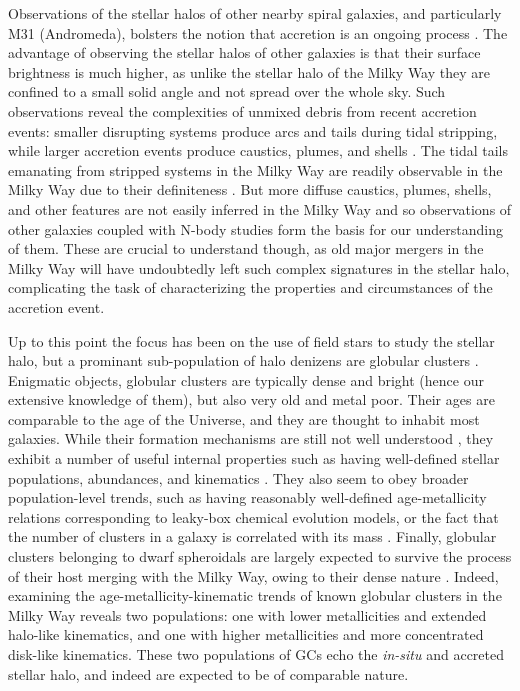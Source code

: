 Observations of the stellar halos of other nearby spiral galaxies, and particularly M31 (Andromeda), bolsters the notion that accretion is an ongoing process \parencite{mcconnachie09,martinez-delgado10}. The advantage of observing the stellar halos of other galaxies is that their surface brightness is much higher, as unlike the stellar halo of the Milky Way they are confined to a small solid angle and not spread over the whole sky. Such observations reveal the complexities of unmixed debris from recent accretion events: smaller disrupting systems produce arcs and tails during tidal stripping, while larger accretion events produce caustics, plumes, and shells \parencite[][provides a good overview of such phenomena]{johnston08}. The tidal tails emanating from stripped systems in the Milky Way are readily observable in the Milky Way due to their definiteness \parencite[e.g.][]{belokurov06}. But more diffuse caustics, plumes, shells, and other features are not easily inferred in the Milky Way and so observations of other galaxies coupled with N-body studies form the basis for our understanding of them. These are crucial to understand though, as old major mergers in the Milky Way will have undoubtedly left such complex signatures in the stellar halo, complicating the task of characterizing the properties and circumstances of the accretion event.

Up to this point the focus has been on the use of field stars to study the stellar halo, but a prominant sub-population of halo denizens are globular clusters \parencite[for catalogues see][]{harris96,baumgardt18}. Enigmatic objects, globular clusters are typically dense and bright (hence our extensive knowledge of them), but also very old and metal poor. Their ages are comparable to the age of the Universe, and they are thought to inhabit most galaxies. While their formation mechanisms are still not well understood \parencite{forbes18a}, they exhibit a number of useful internal properties such as having well-defined stellar populations, abundances, and kinematics \parencite[although many also have multiple populations with slight differences][]{milone22}. They also seem to obey broader population-level trends, such as having reasonably well-defined age-metallicity relations \parencite{forbes10,leaman13} corresponding to leaky-box chemical evolution models, or the fact that the number of clusters in a galaxy is correlated with its mass \parencite{harris13,forbes18b}. Finally, globular clusters belonging to dwarf spheroidals are largely expected to survive the process of their host merging with the Milky Way, owing to their dense nature \parencite{penarrubia09}. Indeed, examining the age-metallicity-kinematic trends of known globular clusters in the Milky Way reveals two populations: one with lower metallicities and extended halo-like kinematics, and one with higher metallicities and more concentrated disk-like kinematics. These two populations of GCs echo the \textit{in-situ} and accreted stellar halo, and indeed are expected to be of comparable nature.

